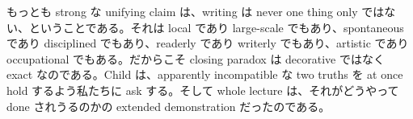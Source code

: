 もっとも strong な unifying claim は、writing は never one thing only ではない、ということである。それは local であり large-scale でもあり、spontaneous であり disciplined でもあり、readerly であり writerly でもあり、artistic であり occupational でもある。だからこそ closing paradox は decorative ではなく exact なのである。Child は、apparently incompatible な two truths を at once hold するよう私たちに ask する。そして whole lecture は、それがどうやって done されうるのかの extended demonstration だったのである。